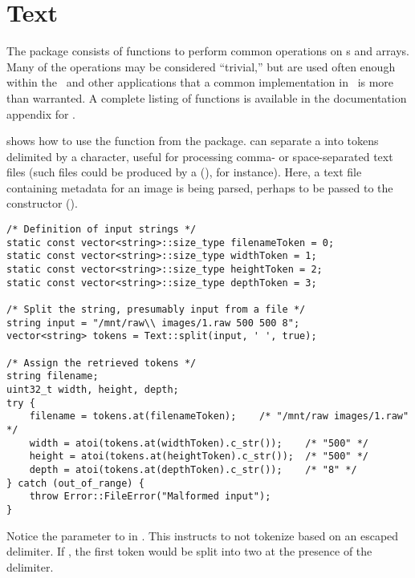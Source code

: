 %
%
\chapter{Text}
\label{chp-text}
The  package consists of functions to perform common operations
on s and  arrays.  Many of the operations may be
considered ``trivial,'' but are used often enough within the \lname\ and
other applications that a common implementation in \sname\ is more
than warranted.  A complete listing of functions is available in the
documentation appendix for .

 shows how to use the  function from the
 package.   can separate a  into
tokens delimited by a character, useful for processing comma- or
space-separated text files (such files could be produced by a
 (), for instance).  Here, a text file
containing metadata for an image is being parsed, perhaps to be passed to 
the  constructor ().


\begin{lstlisting}[caption={Tokenizing a \class{string}}, label=lst:text-split]
/* Definition of input strings */
static const vector<string>::size_type filenameToken = 0;
static const vector<string>::size_type widthToken = 1;
static const vector<string>::size_type heightToken = 2;
static const vector<string>::size_type depthToken = 3;

/* Split the string, presumably input from a file */
string input = "/mnt/raw\\ images/1.raw 500 500 8";
vector<string> tokens = Text::split(input, ' ', true);

/* Assign the retrieved tokens */
string filename;
uint32_t width, height, depth;
try {
	filename = tokens.at(filenameToken);	/* "/mnt/raw images/1.raw" */
	width = atoi(tokens.at(widthToken).c_str());	/* "500" */
	height = atoi(tokens.at(heightToken).c_str());	/* "500" */
	depth = atoi(tokens.at(depthToken).c_str());	/* "8" */
} catch (out_of_range) {
	throw Error::FileError("Malformed input");
}
\end{lstlisting}

Notice the  parameter to  in .
This instructs  to not tokenize based on an escaped delimiter.
If , the first token would be split into two at the presence of the
delimiter.

